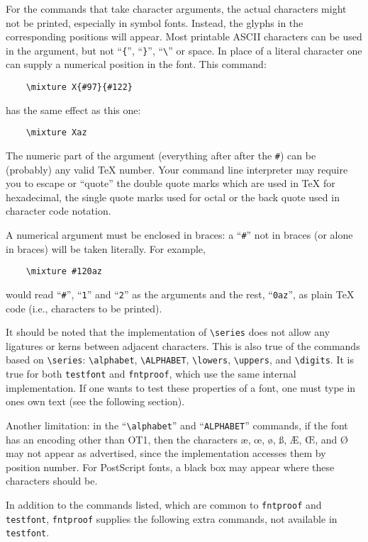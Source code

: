 \documentclass[draft]{article}
\newcommand\file[1]{\texttt{#1}}
\renewcommand\"{\verb"}
\begin{document}
{For the commands that take character arguments, the actual characters
might not be printed, especially in symbol fonts. Instead, the glyphs in
the corresponding positions will appear. Most printable ASCII characters
can be used in the argument, but not ``\"{"'', ``\"}"'', ``\"\"'' or space. In
place of a literal character one can supply a numerical position in the
font. This command:
\begin{verbatim}
    \mixture X{#97}{#122}
\end{verbatim}
has the same effect as this one:
\begin{verbatim}
    \mixture Xaz
\end{verbatim}
The numeric part of the argument (everything after after the \"#") can
be (probably) any valid \TeX{} number. Your command line interpreter may
require you to escape or ``quote'' the double quote marks which are used
in \TeX{} for hexadecimal, the single quote marks used for octal or the
back quote used in character code notation.

A numerical argument must be enclosed in braces: a ``\"#"'' not in braces
(or alone in braces) will be taken literally. For example,
\begin{verbatim}
    \mixture #120az
\end{verbatim}
would read ``\"#"'', ``\"1"'' and ``\"2"'' as the arguments and the rest,
``\"0az"'', as plain \TeX{} code (i.e., characters to be printed).

It should be noted that the implementation of \"\series" does not 
allow any ligatures or kerns between adjacent characters. This is also 
true of the commands based on \"\series": \"\alphabet", \"\ALPHABET", 
\"\lowers", \"\uppers", and \"\digits". It is true for both 
\file{testfont} and \file{fntproof}, which use the same internal 
implementation. If one wants to test these properties of a font, one 
must type in ones own text (see the following section).

Another limitation: in the ``\"\alphabet"'' and ``\"ALPHABET"'' 
commands, if the font has an encoding other than OT1, then the 
characters \ae, \oe, \o, \ss, \AE, \OE, and \O{} may not appear as 
advertised, since the implementation accesses them by position 
number. For PostScript fonts, a black box may appear where these 
characters should be.

In addition to the commands listed, which are common to \file{fntproof} 
and \file{testfont}, \file{fntproof} supplies the following extra 
commands, not available in \file{testfont}.  

}
\end{document}
